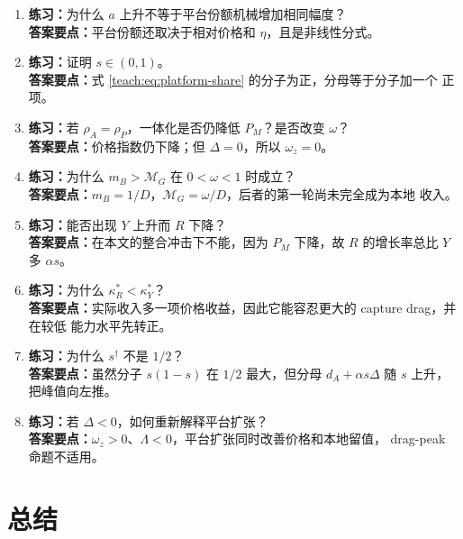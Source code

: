 \documentclass[UTF8,11pt,scheme=chinese,fontset=fandol]{ctexart}
\newcommand{\MG}{\mathcal M_G}
\theoremstyle{definition}
\begin{document}
\begin{enumerate}
  \item \textbf{练习：}为什么 \(a\) 上升不等于平台份额机械增加相同幅度？\\
  \textbf{答案要点：}平台份额还取决于相对价格和 \(\eta\)，且是非线性分式。

  \item \textbf{练习：}证明 \(s\in(0,1)\)。\\
  \textbf{答案要点：}式 \eqref{teach:eq:platform-share} 的分子为正，分母等于分子加一个
  正项。

  \item \textbf{练习：}若 \(\rho_A=\rho_P\)，一体化是否仍降低 \(P_M\)？是否改变
  \(\omega\)？\\
  \textbf{答案要点：}价格指数仍下降；但 \(\Delta=0\)，所以 \(\omega_z=0\)。

  \item \textbf{练习：}为什么 \(m_B>\MG\) 在 \(0<\omega<1\) 时成立？\\
  \textbf{答案要点：}\(m_B=1/D\)，\(\MG=\omega/D\)，后者的第一轮尚未完全成为本地
  收入。

  \item \textbf{练习：}能否出现 \(Y\) 上升而 \(R\) 下降？\\
  \textbf{答案要点：}在本文的整合冲击下不能，因为 \(P_M\) 下降，故 \(R\) 的增长率总比
  \(Y\) 多 \(\alpha s\)。

  \item \textbf{练习：}为什么 \(\kappa_R^*<\kappa_Y^*\)？\\
  \textbf{答案要点：}实际收入多一项价格收益，因此它能容忍更大的 capture drag，并在较低
  能力水平先转正。

  \item \textbf{练习：}为什么 \(s^\dagger\) 不是 \(1/2\)？\\
  \textbf{答案要点：}虽然分子 \(s(1-s)\) 在 \(1/2\) 最大，但分母
  \(d_A+\alpha s\Delta\) 随 \(s\) 上升，把峰值向左推。

  \item \textbf{练习：}若 \(\Delta<0\)，如何重新解释平台扩张？\\
  \textbf{答案要点：}\(\omega_z>0\)、\(\Lambda<0\)，平台扩张同时改善价格和本地留值，
  drag-peak 命题不适用。
\end{enumerate}

\section{总结}
\end{document}
